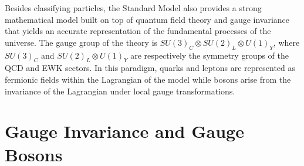   Besides classifying particles, the Standard Model also provides a strong mathematical model built on top of quantum field theory and gauge invariance that yields an accurate representation of the fundamental processes of the universe. The gauge group of the theory is $ SU(3)_C \otimes SU(2)_L \otimes U(1)_Y $, where $ SU(3)_C $ and $ SU(2)_L \otimes U(1)_Y $ are respectively the symmetry groups of the QCD and EWK sectors. In this paradigm, quarks and leptons are represented as fermionic fields within the Lagrangian of the model while bosons arise from the invariance of the Lagrangian under local gauge transformations. \\

  \section{Gauge Invariance and Gauge Bosons}

